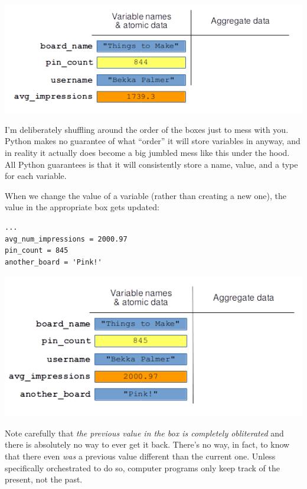 \vspace{-.2in}
\begin{center}
\includegraphics[width=.8\textwidth]{memoryPicture3.png}
\end{center}

I'm deliberately shuffling around the order of the boxes just to mess with you.
Python makes no guarantee of what ``order'' it will store variables in anyway,
and in reality it actually does become a big jumbled mess like this under the
hood. All Python guarantees is that it will consistently store a name, value,
and a type for each variable.

When we change the value of a variable (rather than creating a new one), the
value in the appropriate box gets updated:

\begin{Verbatim}[fontsize=\small,samepage=true,frame=single,framesep=3mm]
...
avg_num_impressions = 2000.97
pin_count = 845
another_board = 'Pink!'
\end{Verbatim}

\vspace{-.2in}
\begin{center}
\includegraphics[width=.7\textwidth]{memoryPicture4.png}
\end{center}

Note carefully that \textit{the previous value in the box is completely
obliterated} and there is absolutely no way to ever get it back. There's no
way, in fact, to know that there even \textit{was} a previous value different
than the current one. Unless specifically orchestrated to do so, computer
programs only keep track of the present, not the past.

